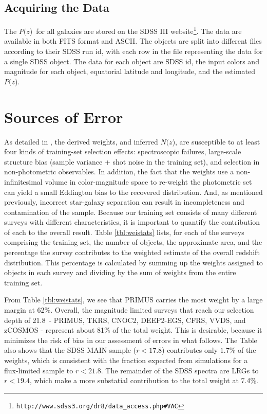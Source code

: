 \documentclass[preprint]{aastex}
\newcommand{\rmax}{21.8}
\newcommand{\pofz}{$P(z$)}
\newcommand{\nofz}{$N(z$)}
\newcommand{\downloadURL}{{\tt http://www.sdss3.org/dr8/data\_access.php\#VAC}}
\begin{document}
\subsection{Acquiring the Data} \label{sec:get}

The \pofz\ for all galaxies are stored on the SDSS III
website\footnote{\downloadURL}.  The data are available in both FITS format and
ASCII.  The objects are split into different files according to their SDSS run
id, with each row in the file representing the data for a single SDSS object.
The data for each object are SDSS id, the input colors and magnitude for each
object, equatorial latitude and longitude, and the estimated \pofz.



\section{Sources of Error} \label{sec:errors}

As detailed in \cite{CunhaPhotoz09}, the derived weights, and inferred \nofz,
are susceptible to at least four kinds of training-set selection effects:
spectroscopic failures, large-scale structure bias (sample variance + shot
noise in the training set), and selection in non-photometric observables.  In
addition, the fact that the weights use a non-infinitesimal volume in color-magnitude
space to re-weight the photometric set can yield a small Eddington bias to the
recovered distribution.  And, as mentioned previously, incorrect star-galaxy
separation can result in incompleteness and contamination of the sample.
Because our training set consists of many different surveys with different
characteristics, it is important to quantify the contribution of each to the
overall result.  Table \ref{tbl:weistats} lists, for each of the surveys
comprising the training set, the number of objects, the approximate area, and
the percentage the survey contributes to the weighted estimate of the overall
redshift distribution.  This percentage is calculated by summing up the weights
assigned to objects in each survey and dividing by the sum of weights from the
entire training set.


From Table \ref{tbl:weistats}, we see that PRIMUS carries the most weight by a
large margin at 62\%.  Overall, the magnitude limited surveys that reach our
selection depth of \rmax\ - PRIMUS, TKRS, CNOC2, DEEP2-EGS, CFRS, VVDS, and
zCOSMOS - represent about 81$\%$ of the total weight.  
This is desirable,
because it minimizes the risk of bias in our assessment of errors in what follows.
The Table also shows that the SDSS MAIN sample ($r<17.8$) contributes only $1.7\%$ of the weights, which
is consistent with the fraction expected from simulations for a flux-limited sample 
to $r<21.8$.
The remainder of the SDSS spectra are LRGs to $r<19.4$, which make a more
substatial contribution to the total weight at 7.4\%.
\end{document}
